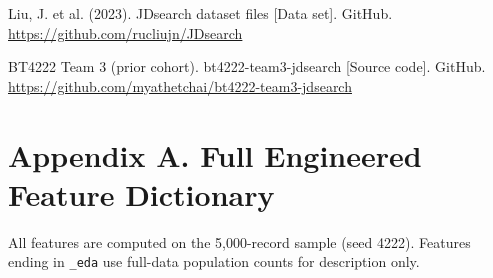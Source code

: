 \documentclass[11pt,a4paper]{article}
\newenvironment{hangparagraph}{\par\setlength{\leftskip}{1.2cm}\setlength{\parindent}{-1.2cm}}{\par}
\begin{document}
\begin{hangparagraph}
Liu, J. et al. (2023). JDsearch dataset files [Data set]. GitHub. \url{https://github.com/rucliujn/JDsearch}
\end{hangparagraph}

\begin{hangparagraph}
BT4222 Team 3 (prior cohort). bt4222-team3-jdsearch [Source code]. GitHub. \url{https://github.com/myathetchai/bt4222-team3-jdsearch}
\end{hangparagraph}

\clearpage
\section*{Appendix A. Full Engineered Feature Dictionary}

All features are computed on the 5,000-record sample (seed 4222). Features ending in \texttt{\_eda} use full-data population counts for description only.
\end{document}
